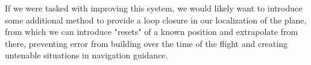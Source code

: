 \documentclass{article}
\begin{document}
If we were tasked with improving this system, we would likely want to introduce some additional method to provide a loop closure in our localization of the plane, from which we can introduce "resets" of a known position and extrapolate from there, preventing error from building over the time of the flight and creating untenable situations in navigation guidance.
\end{document}
